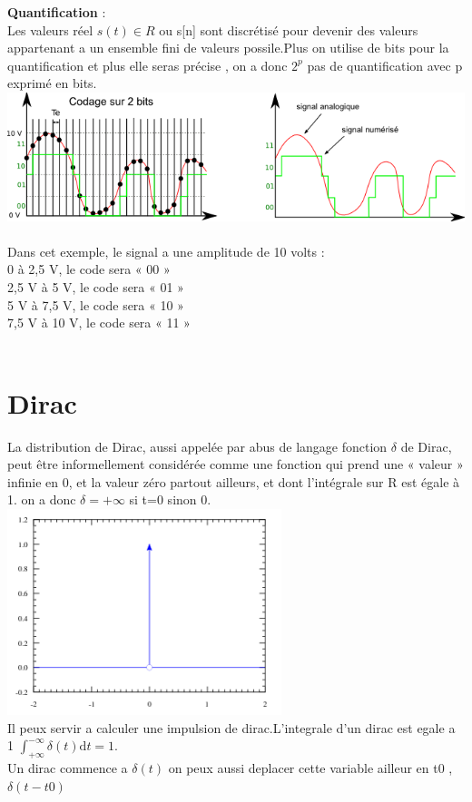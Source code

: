 \documentclass[a4paper,8pt,openany]{book}
\begin{document}
\textbf{Quantification} :\\
 Les valeurs r\'eel $s(t)\in R$ ou s[n] sont discr\'etis\'e pour devenir des valeurs appartenant a un ensemble fini de valeurs possile.Plus on utilise de bits pour la quantification et plus elle seras pr\'ecise , on a donc $2^p$ pas de quantification avec p exprim\'e en bits. \\
\includegraphics[width=1\textwidth,center]{img/quantification.png}\\
\\
Dans cet exemple, le signal a une amplitude de 10 volts :\\
0 à 2,5 V, le code sera « 00 »\\
2,5 V à 5 V, le code sera « 01 »\\
5 V à 7,5 V, le code sera « 10 »\\
7,5 V à 10 V, le code sera « 11 »\\
\\


\chapter{Dirac}
La distribution de Dirac, aussi appelée par abus de langage fonction $\delta$ de Dirac, peut être informellement considérée comme une fonction qui prend une « valeur » infinie en 0, et la valeur zéro partout ailleurs, et dont l'intégrale sur R est égale à 1. on a donc $\delta = +\infty$ si t=0 sinon 0.\\
\includegraphics[width=0.60\textwidth,center]{img/dirac.png}
\\
Il peux servir a calculer une impulsion de dirac.L'integrale d'un dirac est egale a 1 $\int_{+\infty}^{-\infty} \delta(t) \mathrm dt = 1$.\\
Un dirac commence a $\delta(t)$  on peux aussi deplacer cette variable ailleur en t0 , $\delta(t-t0)$\\
\\
\end{document}
